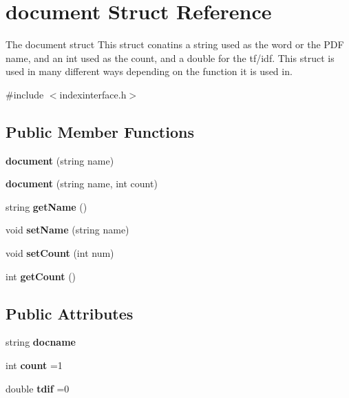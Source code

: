 \section{document Struct Reference}
\label{structdocument}


The document struct This struct conatins a string used as the word or the P\+DF name, and an int used as the count, and a double for the tf/idf. This struct is used in many different ways depending on the function it is used in.  




{\ttfamily \#include $<$indexinterface.\+h$>$}

\subsection*{Public Member Functions}
\begin{DoxyCompactItemize}
\item 
{\bfseries document} (string name)\label{structdocument_a73102ad6433b782691866acc2b0f3445}

\item 
{\bfseries document} (string name, int count)\label{structdocument_acb86cbf4e1a0549888ec9edc0fa58253}

\item 
string {\bfseries get\+Name} ()\label{structdocument_a1a04e6dcf760b7fde063b3e1f68cc890}

\item 
void {\bfseries set\+Name} (string name)\label{structdocument_a4aca298655daebf017e0bb4c29dc5c1c}

\item 
void {\bfseries set\+Count} (int num)\label{structdocument_a1e82f4325b83f252511c93927beb8a18}

\item 
int {\bfseries get\+Count} ()\label{structdocument_a66b165da6c3013637aa5f63a9faef15a}

\end{DoxyCompactItemize}
\subsection*{Public Attributes}
\begin{DoxyCompactItemize}
\item 
string {\bfseries docname}\label{structdocument_a709e8f2cc77c7e1ef3e2764ea617bb5a}

\item 
int {\bfseries count} =1\label{structdocument_ac9a5775492799ee21c32a4c84aefaffc}

\item 
double {\bfseries tdif} =0\label{structdocument_a85580a39269bfeb2e22b1d7cd55c163c}

\end{DoxyCompactItemize}


